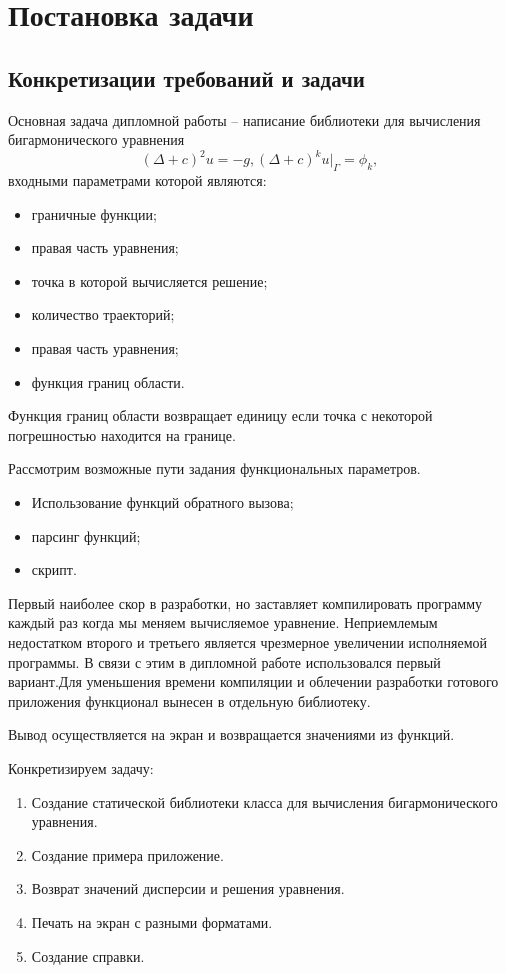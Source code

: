\chapter{Постановка задачи}
\section{Конкретизации требований и задачи}
Основная задача дипломной работы -- написание библиотеки для вычисления бигармонического уравнения $$ (\Delta +c)^{2}u=-g, (\Delta+c)^{k}u|_{\Gamma}=\phi_{k}, $$входными параметрами которой являются:
\begin{itemize}
	\item граничные функции;
	\item правая часть уравнения;
	\item точка в которой вычисляется решение;
	\item количество траекторий;
	\item правая часть уравнения;
	\item функция границ области.
\end{itemize}
Функция границ области возвращает единицу если точка с некоторой погрешностью находится на границе. 

Рассмотрим возможные пути задания функциональных параметров.
\begin{itemize}
	\item Использование функций обратного вызова;
	\item парсинг функций;
	\item скрипт.
\end{itemize}
Первый наиболее скор в разработки, но заставляет компилировать программу каждый раз когда мы меняем вычисляемое уравнение. Неприемлемым недостатком второго и третьего является чрезмерное увеличении исполняемой программы. В связи с этим в дипломной работе использовался первый вариант.Для уменьшения времени компиляции и облечении разработки готового приложения функционал вынесен в отдельную библиотеку. 

Вывод осуществляется на экран и возвращается значениями из функций. 

Конкретизируем задачу: 
\begin{enumerate}
	\item Создание статической библиотеки класса для вычисления бигармонического уравнения.
	\item Создание примера приложение.
	\item Возврат значений дисперсии и решения уравнения.
	\item Печать на экран с разными форматами.
	\item Создание справки.
\end{enumerate}
